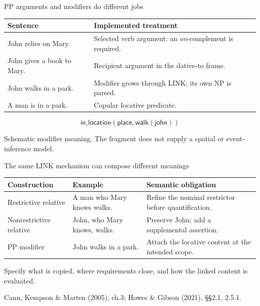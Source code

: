 \documentclass[aspectratio=169,11pt]{beamer}
\newcommand{\aside}[1]{\par{\small\color{Muted}#1}\par}
\newcommand{\keypoint}[1]{\begin{block}{}#1\end{block}}
\newcommand{\pred}[1]{\mathsf{#1}}
\newcommand{\source}[1]{\par\vfill{\scriptsize\color{Muted}#1}\par}
\begin{document}
\begin{frame}{PP arguments and modifiers do different jobs}
  \color{Ink}
  \begin{tabularx}{\textwidth}{@{}p{48mm}Y@{}}\toprule
    \textbf{Sentence} & \textbf{Implemented treatment}\\\midrule
    John relies \alert{on Mary}. & Selected verb argument: an \emph{on}-complement is required.\\[6pt]
    John gives a book \alert{to Mary}. & Recipient argument in the dative-to frame.\\[6pt]
    John walks \alert{in a park}. & Modifier grows through LINK; its own NP is parsed.\\[6pt]
    A man is \alert{in a park}. & Copular locative predicate.\\\bottomrule
  \end{tabularx}\par
  \vspace{4mm}
  \[\pred{in\_location}(\pred{place},\pred{walk}(\pred{john}))\]
  \aside{Schematic modifier meaning. The fragment does not supply a spatial or event-inference model.}
\end{frame}

\begin{frame}{The same LINK mechanism can compose different meanings}
  \color{Ink}
  \begin{tabularx}{\textwidth}{@{}p{32mm}YY@{}}\toprule
    \textbf{Construction} & \textbf{Example} & \textbf{Semantic obligation}\\\midrule
    Restrictive relative & A man who Mary knows walks. & Refine the nominal restrictor before quantification.\\[7pt]
    Nonrestrictive relative & John, who Mary knows, walks. & Preserve John; add a supplemental assertion.\\[7pt]
    PP modifier & John walks in a park. & Attach the locative content at the intended scope.\\\bottomrule
  \end{tabularx}\par
  \vspace{3mm}
  \keypoint{Specify what is copied, where requirements close, and how the linked content is evaluated.}
  \source{Cann, Kempson \& Marten (2005), ch.3; Howes \& Gibson (2021), §§2.1, 2.5.1.}
\end{frame}
\end{document}
